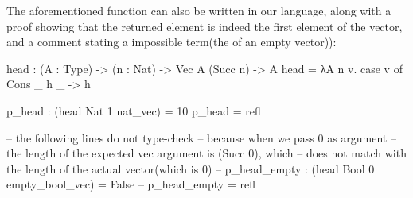 \documentclass[
       embeddedlogo,
       english,
       lmodern,
       coorientadorbanca,
       noabntexcite
]{ufsc-thesis-rn46-2019}
\theoremstyle{definition}
\newcommand{\code}[1]{\text{\scpfamily\setlength\spaceskip{0.35em}#1}}
\begin{document}
The aforementioned \code{head} function can also be written in our language, along with a proof showing that the returned element is indeed the first element of the vector, and a comment stating a impossible term(the \code{head} of an empty vector)): 
\begin{piforall}
head : (A : Type) -> (n : Nat) -> Vec A (Succ n) -> A
head = λA n v. case v of {
  Cons _ h _ -> h
}

p_head : (head Nat 1 nat_vec) = 10
p_head = refl

-- the following lines do not type-check
-- because when we pass 0 as argument
-- the length of the expected vec argument is (Succ 0), which
-- does not match with the length of the actual vector(which is 0)
-- p_head_empty : (head Bool 0 empty_bool_vec) = False
-- p_head_empty = refl
\end{piforall}

\postextual
\printbibliography{}
\end{document}

